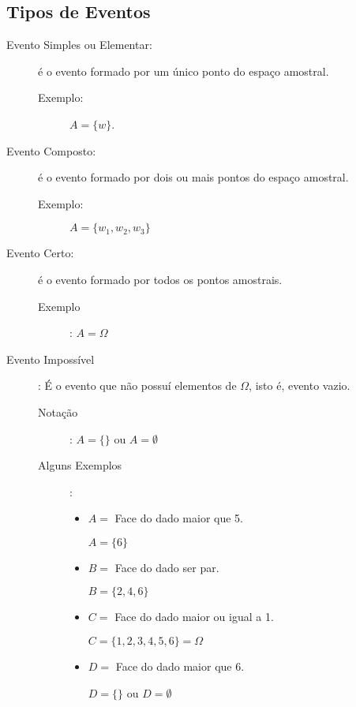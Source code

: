 \subsection{Tipos de Eventos}

\begin{description}
  \item [Evento Simples ou Elementar:] é o evento formado por um único ponto do espaço amostral. 
    \begin{description}
      \item [Exemplo:]
        $A=\{w \}$.
    \end{description}

  \item [Evento Composto:]  é o evento formado por dois ou mais pontos do espaço amostral.

    \begin{description}
      \item[Exemplo:]
        $ A= \{w_1,w_2,w_3 \}$
    \end{description}

  \item [Evento Certo:] é o evento formado por todos os pontos amostrais.
    \begin{description}
      \item    [Exemplo]: $A= \Omega$ 
    \end{description}
  \item [Evento Impossível]: É o evento que não possuí elementos de $\Omega$, isto é, evento vazio.
    \begin{description}
      \item [Notação]: $A=\{\}$ ou $A= \emptyset$

      \item    [Alguns Exemplos]:
        \begin{itemize}[label=]
          \item  $A=$ Face do dado maior que 5.

            $A=\{6\}$

          \item    $B=$ Face do dado ser par.

            $B= \{2,4,6\}$

          \item    $C=$ Face do dado maior ou igual a 1.

            $C= \{1,2,3,4,5,6\}=\Omega$

          \item        $D=$ Face do dado maior que 6.


            $D=\{ \}$ ou $D=\emptyset$
        \end{itemize}


    \end{description}
\end{description}
